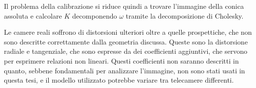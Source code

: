 Il problema della calibrazione si riduce quindi a trovare l'immagine della conica assoluta e calcolare $K$ decomponendo $\omega$ tramite la decomposizione di Cholesky.

Le camere reali soffrono di distorsioni ulteriori oltre a quelle prospettiche, che non sono descritte correttamente dalla geometria discussa. Queste sono la distorsione radiale e tangenziale, che sono espresse da dei coefficienti aggiuntivi, che servono per esprimere relazioni non lineari. Questi coefficienti non saranno descritti in quanto, sebbene fondamentali per analizzare l'immagine, non sono stati usati in questa tesi, e il modello utilizzato potrebbe variare tra telecamere differenti.




